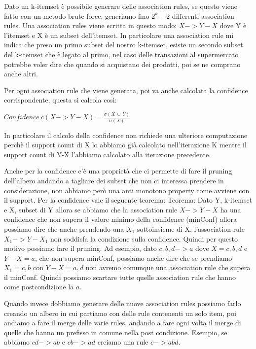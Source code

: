 \documentclass[14pt]{extreport}
\begin{document}
Dato un k-itemset è possibile generare delle association rules, se questo viene fatto con un metodo brute force, generiamo fino $2^k-2$ differenti association rules.
Una association rules viene scritta in questo modo: $X->Y-X$ dove Y è l'itemset e X è un subset dell'itemset. In particolare una association rule mi indica che preso un primo subset del nostro k-itemset, esiste un secondo subset del k-itemset che è legato al primo, nel caso delle transazioni al supermercato potrebbe voler dire che quando si acquistano dei prodotti, poi se ne comprano anche altri.

Per ogni association rule che viene generata, poi va anche calcolata la confidence corrispondente, questa si calcola così:
\newline
\centerline{$Confidence \ c(X->Y-X) = \frac{\sigma{(X\ \cup \ Y)}}{\sigma{(X)}}$}

In particolare il calcolo della confidence non richiede una ulteriore computazione perchè il support count di X lo abbiamo già calcolato nell'iterazione K mentre il support count di Y-X l'abbiamo calcolato alla iterazione precedente.

Anche per la confidence c'è una proprietà che ci permette di fare il pruning dell'albero andando a tagliare dei subset che non ci interessa prendere in considerazione, non abbiamo però una anti monotono property come avviene con il support.
Per la confidence vale il seguente teorema:
\newline
Teorema: Dato Y, k-itemset e X, subset di Y allora se abbiamo che la association rule $X->Y-X$ ha una confidence che non supera il valore minimo della confidence (minConf) allora possiamo dire che anche prendendo una $X_1$ sottoinsieme di X, l'association rule $X_1->Y-X_1$ non soddisfa la condizione sulla confidence. Quindi per questo motivo possiamo fare il pruning. Ad esempio, dato ${c,b,d}->{a}$ dove $X={c,b,d}$ e $Y-X = {a}$, che non supera minConf, possiamo anche dire che se prendiamo $X_1 = {c,b}$ con $Y-X = {a,d}$ non avremo comunque una association rule che supera il minConf. Quindi possiamo scartare tutte quelle association rule che hanno come postcondizione la ${a}$.

Quando invece dobbiamo generare delle nuove association rules possiamo farlo creando un albero in cui partiamo con delle rule contenenti un solo item, poi andiamo a fare il merge delle varie rules, andando a fare ogni volta il merge di quelle che hanno un prefisso in comune nella post condizione. Esempio, se abbiamo ${cd}->{ab}$ e ${cb}->{ad}$ creiamo una rule ${c}->{abd}$.
\end{document}
